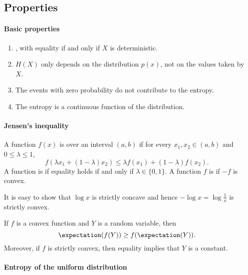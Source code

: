 \documentclass[a4paper, 11pt, openany]{book}
\begin{document}
\subsection{Properties}

\paragraph{Basic properties}

\begin{enumerate}
	\item {}, with equality if and only if $X$ is deterministic.

	\item $H(X)$ only depends on the distribution $p(x)$, not on the values taken by $X$.

	\item The events with zero probability do not contribute to the entropy.

	\item The entropy is a continuous function of the distribution.
\end{enumerate}









\paragraph{Jensen's inequality}

A function $f(x)$ is  over an interval $(a,b)$ if for every $x_1, x_2 \in (a,b)$ and $0 \le \lambda \le 1$,
\[
	f(\lambda x_1 + (1- \lambda) x_2) \le \lambda f(x_1) + (1- \lambda) f(x_2).
\]
A function is  if equality holds if and only if $\lambda \in \{0,1\}$. A function $f$ is  if $-f$ is convex.

It is easy to show that $\log x$ is strictly concave and hence $-\log x = \log \frac{1}{x}$ is strictly convex.

\begin{theorem}
If $f$ is a convex function and $Y$ is a random variable, then
\[
	\expectation ( f(Y) ) \ge f( \expectation( Y ) ).
\]
Moreover, if $f$ is strictly convex, then equality implies that $Y$ is a constant.
\end{theorem}



\paragraph{Entropy of the uniform distribution}
\end{document}
